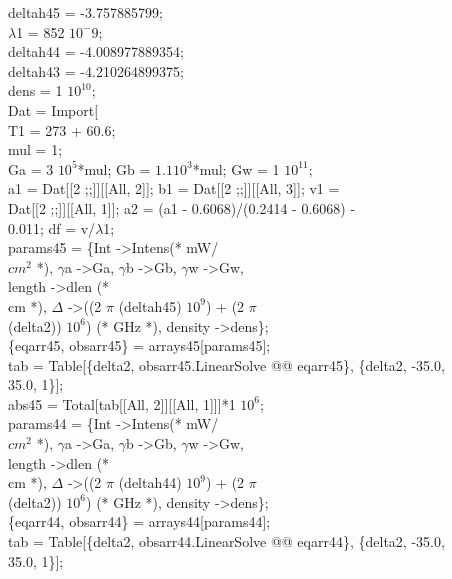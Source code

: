 \begin{enumerate}
{deltah45 = -3.757885799;\\
$\lambda$1 = 852 $10^-9$;\\
deltah44 = -4.008977889354;\\
deltah43 = -4.210264899375;\\
dens = 1 $10^10$;\\

Dat = Import[\\

T1 = 273 + 60.6;\\
mul = 1;\\
Ga = 3 $10^5$*mul; Gb = $1.1 10^3$*mul; Gw = 1 $10^11$;\\
a1 = Dat[[2 ;;]][[All, 2]]; b1 = Dat[[2 ;;]][[All, 3]]; v1 = \\
 Dat[[2 ;;]][[All, 1]]; a2 = (a1 - 0.6068)/(0.2414 - 0.6068) - \\
  0.011; df = v/$\lambda$1;\\
params45 = \{Int -\textgreater Intens(* mW/\\
   $cm^2$ *), $\gamma$a -\textgreater Ga, $\gamma$b -\textgreater Gb, $\gamma$w -\textgreater Gw, \\
   length -\textgreater dlen (* \\
   cm *), $\Delta$ -\textgreater ((2 $\pi$ (deltah45) $10^{9}$) + (2 $\pi$ \ \\
(delta2)) $10^6$) (* GHz *), density -\textgreater dens\};\\
\{eqarr45, obsarr45\} = arrays45[params45];\\
tab = Table[\{delta2, obsarr45.LinearSolve @@ eqarr45\}, \{delta2, -35.0,\\
     35.0, 1\}];\\
abs45 = Total[tab[[All, 2]][[All, 1]]]*1 $10^6$;\\
params44 = \{Int -\textgreater Intens(* mW/\\
   $cm^2$ *), $\gamma$a -\textgreater Ga, $\gamma$b -\textgreater Gb, $\gamma$w -\textgreater Gw, \\
   length -\textgreater dlen (* \\
   cm *), $\Delta$ -\textgreater ((2 $\pi$ (deltah44) $10^9$) + (2 $\pi$\\
(delta2)) $10^6$) (* GHz *), density -\textgreater dens\};\\
\{eqarr44, obsarr44\} = arrays44[params44];\\
tab = Table[\{delta2, obsarr44.LinearSolve @@ eqarr44\}, \{delta2, -35.0,\\
     35.0, 1\}];\\
}
\end{enumerate}
